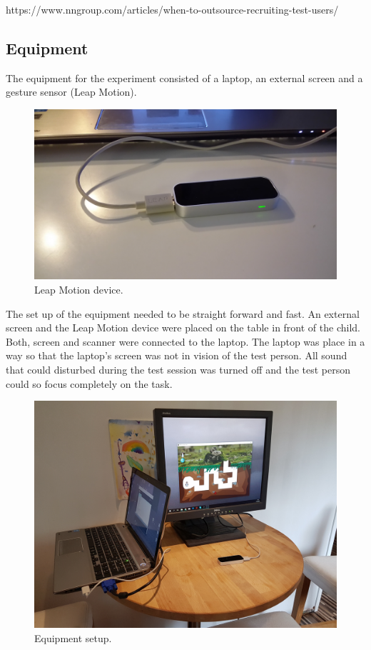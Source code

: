 https://www.nngroup.com/articles/when-to-outsource-recruiting-test-users/



\subsection{Equipment}

The equipment for the experiment consisted of a laptop, an external screen and a gesture sensor (Leap Motion). 

\begin{figure}[h]  %
  \centering
  \includegraphics[width=.5\textwidth]{figures/LMdevice.jpg}
  \caption[Leap Motion device.]{Leap Motion device.}
  \label{fig:leapmotiondevice}
\end{figure}

The set up of the equipment needed to be straight forward and fast. An external screen and the Leap Motion device were placed on the table in front of the child. Both, screen and scanner were connected to the laptop. The laptop was place in a way so that the laptop’s screen was not in vision of the test person. All sound that could disturbed during the test session was turned off and the test person could so focus completely on the task.

\begin{figure}[h]  %
  \centering
  \includegraphics[width=.5\textwidth]{figures/setup.jpg}
  \caption[Equipment setup.]{Equipment setup.}
  \label{fig:equipmentsetup}
\end{figure}


